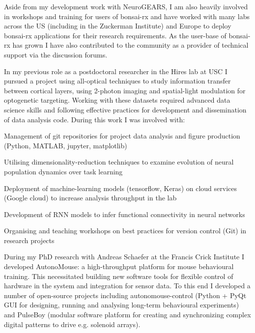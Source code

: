 \documentclass[11pt, letterpaper]{awesome-cv}
\begin{document}
Aside from my development work with NeuroGEARS, I am also heavily involved in workshops and training for users of bonsai-rx and have worked with many labs across the US (including in the Zuckerman Institute) and Europe to deploy bonsai-rx applications for their research requirements. As the user-base of bonsai-rx has grown I have also contributed to the community as a provider of technical support via the discussion forums.

In my previous role as a postdoctoral researcher in the Hires lab at USC I pursued a project using all-optical techniques to study information transfer between cortical layers, using 2-photon imaging and spatial-light modulation for optogenetic targeting. Working with these datasets required advanced data science skills and following effective practices for development and dissemination of data analysis code. During this work I was involved with:
\vspace{1em}
\begin{cvitems}
  \item {Management of git repositories for project data analysis and figure production (Python, MATLAB, jupyter, matplotlib)}
  \item {Utilising dimensionality-reduction techniques to examine evolution of neural population dynamics over task learning}
  \item {Deployment of machine-learning models (tensorflow, Keras) on cloud services (Google cloud) to increase analysis throughput in the lab}
  \item {Development of RNN models to infer functional connectivity in neural networks}
  \item {Organising and teaching workshops on best practices for version control (Git) in research projects}
\end{cvitems}
\vspace{1em}

During my PhD research with Andreas Schaefer at the Francis Crick Institute I developed AutonoMouse: a high-throughput platform for mouse behavioural training. This necessitated building new software tools for flexible control of hardware in the system and integration for sensor data. To this end I developed a number of open-source projects including autonomouse-control (Python + PyQt GUI for designing, running and analysing long-term behavioural experiments) and PulseBoy (modular software platform for creating and synchronizing complex digital patterns to drive e.g. solenoid arrays).
\end{document}
